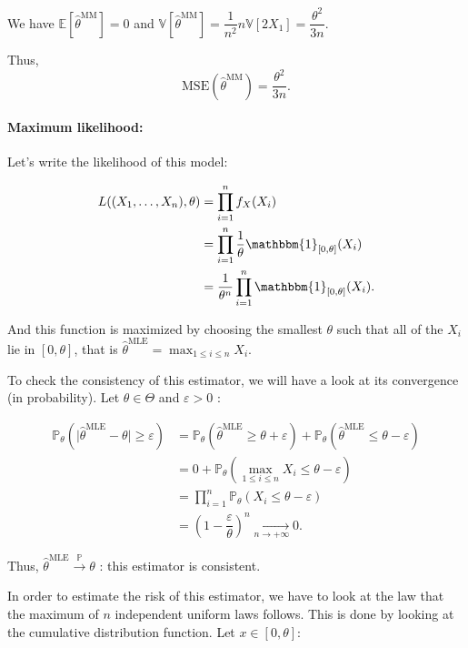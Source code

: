 We have $\mathbb{E}[\hat{\theta}^{\text{MM}}] = 0$ and $\mathbb{V}[\hat{\theta}^{\text{MM}}] = \dfrac{1}{n^2}n\mathbb{V}[2X_1] = \dfrac{\theta^2}{3n}.$\newline

Thus, $$\text{MSE}(\hat{\theta}^{\text{MM}}) = \dfrac{\theta^2}{3n}.$$


\paragraph*{Maximum likelihood:}

Let's write the likelihood of this model:

\begin{align*}
    L((X_1,\dots,X_n), \theta) &= \displaystyle \prod_{i=1}^{n} f_X(X_i) \\
    &= \displaystyle \prod_{i=1}^{n} \dfrac{1}{\theta} \mathbbm{1}_{[0, \theta]}(X_i)\\
    &= \dfrac{1}{\theta^n} \prod_{i=1}^{n} \mathbbm{1}_{[0, \theta]}(X_i).
\end{align*}

And this function is maximized by choosing the smallest $\theta$ such that all of the $X_i$ lie in $[0, \theta]$, that is $\hat{\theta}^{\text{MLE}} = \max_{1\leq i \leq n} X_i.$\newline

To check the consistency of this estimator, we will have a look at its convergence (in probability). Let $\theta \in \Theta$ and $\varepsilon >0$ :

\begin{align*}
    \mathbb{P}_\theta(\lvert\hat{\theta}^{\text{MLE}} - \theta\rvert \ge \varepsilon) &= \mathbb{P}_\theta(\hat{\theta}^{\text{MLE}} \ge \theta + \varepsilon) + \mathbb{P}_\theta(\hat{\theta}^{\text{MLE}} \le \theta - \varepsilon)\\
    &= 0 + \mathbb{P}_\theta(\max_{1\leq i \leq n} X_i \le \theta - \varepsilon)\\
    &= \prod_{i=1}^{n} \mathbb{P}_\theta(X_i \le \theta - \varepsilon)\\
    &= \left(1 - \dfrac{\varepsilon}{\theta} \right)^n \underset{n\to +\infty}{\longrightarrow} 0.
\end{align*}


Thus, $\hat{\theta}^{\text{MLE}} \xrightarrow{\mathbb{P}} \theta$ : this estimator is consistent.\newline

In order to estimate the risk of this estimator, we have to look at the law that the maximum of $n$ independent uniform laws follows. This is done by looking at the cumulative distribution function. Let $x \in [0,\theta] :$

